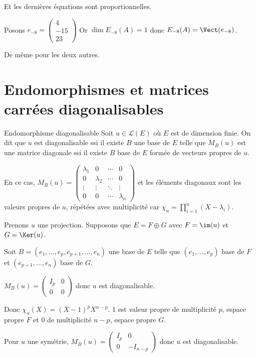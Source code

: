 \begin{exemple}
    Et les dernières équations sont proportionnelles. 

    Posons $e_{-8} = \begin{pmatrix}
        4 \\ 
        -15 \\
        23
    \end{pmatrix}$ Or $\dim E_{-8}(A) = 1$ donc $E_{-8}(A) = \Vect(e_{-8})$.

    De même pour les deux autres. 
\end{exemple}

\section{Endomorphismes et matrices carrées diagonalisables}

\begin{definition}{Endomorphisme diagonalisable}{}
    Soit $u \in \mathscr L(E)$ où $E$ est de dimension finie. On dit que $u$ est diagonalisable ssi il existe 
    $B$ une base de $E$ telle que $M_B(u)$ est une matrice diagonale ssi il existe 
    $B$ base de $E$ formée de vecteurs propres de $u$.

    En ce cas, $M_B(u) = \begin{pmatrix}
        \lambda_1 & 0 & \cdots & 0 \\
        0 & \lambda_2 & \cdots & 0 \\
        \vdots & \vdots & \ddots & \vdots \\
        0 & 0 & \cdots & \lambda_n
    \end{pmatrix}$ et les éléments diagonaux sont les valeurs propres de $u$, répétées avec multiplicité car 
    $\displaystyle \chi_u = \prod_{i = 1 }^{ n } (X - \lambda_i)$.
\end{definition}

\begin{exemple}
    Prenons $u$ une projection. Supposons que $E = F \oplus G$ avec $F = \im(u)$ et $G = \Ker(u)$.

    Soit $B = (e_1, \dots, e_p, e_{p + 1}, \dots, e_n)$ une base de $E$ telle que 
    $(e_1, \dots, e_p)$ base de $F$ et $(e_{p + 1}, \dots, e_n)$ base de $G$.

    $M_B(u) = \begin{pmatrix}
        I_p & 0 \\
        0 & 0
    \end{pmatrix}$ donc $u$ est diagonalisable.

    Donc $\chi_u(X) = (X - 1)^p X^{n - p}$. $1$ est valeur propre de multiplicité $p$, espace propre 
    $F$ et $0$ de multiplicité $n - p$, espace propre $G$.

    \lvspace Pour $u$ une symétrie, $M_B(u) = \begin{pmatrix}
        I_p & 0 \\
        0 & -I_{n - p}
    \end{pmatrix}$ donc $u$ est diagonalisable.
\end{exemple}

